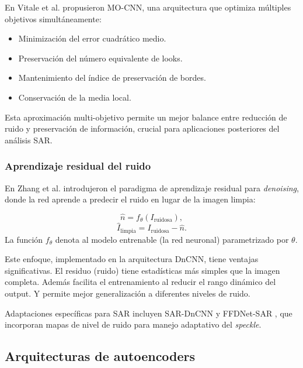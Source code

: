 En Vitale et al. \cite{vitale2021multiobjective} propusieron MO-CNN, una arquitectura que optimiza múltiples objetivos simultáneamente:

\begin{itemize}
	\item Minimización del error cuadrático medio.
	\item Preservación del número equivalente de looks.
	\item Mantenimiento del índice de preservación de bordes.
	\item Conservación de la media local.
\end{itemize}
Esta aproximación multi-objetivo permite un mejor balance entre reducción de ruido y preservación de información, crucial para aplicaciones posteriores del análisis SAR.

\subsubsection{Aprendizaje residual del ruido}

En Zhang et al. \cite{zhang2016beyond} introdujeron el paradigma de aprendizaje residual para \emph{denoising}, donde la red aprende a predecir el ruido en lugar de la imagen limpia:

\begin{equation}
	\hat{n} = f_\theta(I_{\text{ruidosa}}),
\end{equation}
\begin{equation}
	\hat{I}_{\text{limpia}} = I_{\text{ruidosa}} - \hat{n}.
\end{equation}
La función $f_\theta$ denota al modelo entrenable (la red neuronal) parametrizado por $\theta$.

Este enfoque, implementado en la arquitectura DnCNN, tiene ventajas significativas. El residuo (ruido) tiene estadísticas más simples que la imagen completa. Además facilita el entrenamiento al reducir el rango dinámico del output. Y permite mejor generalización a diferentes niveles de ruido.

Adaptaciones específicas para SAR incluyen SAR-DnCNN \cite{yuan2018hyperspectral} y FFDNet-SAR \cite{zhang2018ffdnet}, que incorporan mapas de nivel de ruido para manejo adaptativo del \emph{speckle}.

\subsection{Arquitecturas de autoencoders}

